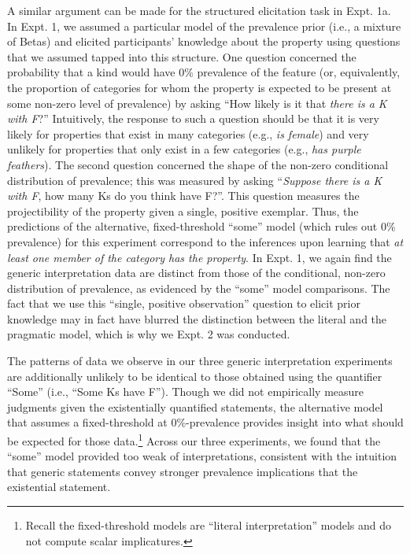 \documentclass[floatsintext,doc]{apa6}
\let\rmarkdownfootnote\footnote%
\def\footnote{\protect\rmarkdownfootnote}
\begin{document}
A similar argument can be made for the structured elicitation task in Expt. 1a.
In Expt. 1, we assumed a particular model of the prevalence prior (i.e., a mixture of Betas) and elicited participants' knowledge about the property using questions that we assumed tapped into this structure.
One question concerned the probability that a kind would have 0\% prevalence of the feature (or, equivalently, the proportion of categories for whom the property is expected to be present at some non-zero level of prevalence) by asking \enquote{How likely is it that \emph{there is a K with F}?}
Intuitively, the response to such a question should be that it is very likely for properties that exist in many categories (e.g., \emph{is female}) and very unlikely for properties that only exist in a few categories (e.g., \emph{has purple feathers}).
The second question concerned the shape of the non-zero conditional distribution of prevalence; this was measured by asking \enquote{\emph{Suppose there is a K with F}, how many Ks do you think have F?}.
This question measures the projectibility of the property given a single, positive exemplar.
Thus, the predictions of the alternative, fixed-threshold \enquote{some} model (which rules out 0\% prevalence) for this experiment correspond to the inferences upon learning that \emph{at least one member of the category has the property}.
In Expt. 1, we again find the generic interpretation data are distinct from those of the conditional, non-zero distribution of prevalence, as evidenced by the \enquote{some} model comparisons.
The fact that we use this \enquote{single, positive observation} question to elicit prior knowledge may in fact have blurred the distinction between the literal and the pragmatic model, which is why we Expt. 2 was conducted.

The patterns of data we observe in our three generic interpretation experiments are additionally unlikely to be identical to those obtained using the quantifier \enquote{Some} (i.e., \enquote{Some Ks have F}).
Though we did not empirically measure judgments given the existentially quantified statements, the alternative model that assumes a fixed-threshold at 0\%-prevalence provides insight into what should be expected for those data.\footnote{Recall the fixed-threshold models are \enquote{literal interpretation} models and do not compute scalar implicatures.}
Across our three experiments, we found that the \enquote{some} model provided too weak of interpretations, consistent with the intuition that generic statements convey stronger prevalence implications that the existential statement.
\end{document}
